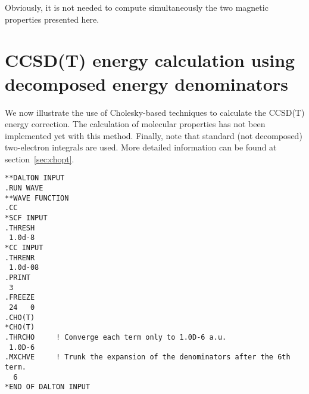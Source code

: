 Obviously, it is not needed to compute simultaneously the two
magnetic properties presented here.

\section{CCSD(T) energy calculation using decomposed 
         energy denominators}

We now illustrate the use of Cholesky-based techniques to calculate
the CCSD(T) energy correction. The calculation of molecular 
properties has not been implemented yet with this method. Finally,
note that standard (not decomposed) two-electron integrals are 
used. More detailed information can be found at section~\ref{sec:chopt}.

\begin{verbatim}
**DALTON INPUT
.RUN WAVE
**WAVE FUNCTION
.CC
*SCF INPUT
.THRESH
 1.0d-8
*CC INPUT
.THRENR
 1.0d-08
.PRINT
 3
.FREEZE
 24   0
.CHO(T)
*CHO(T)
.THRCHO     ! Converge each term only to 1.0D-6 a.u.
 1.0D-6
.MXCHVE     ! Trunk the expansion of the denominators after the 6th term.
  6
*END OF DALTON INPUT
\end{verbatim}
